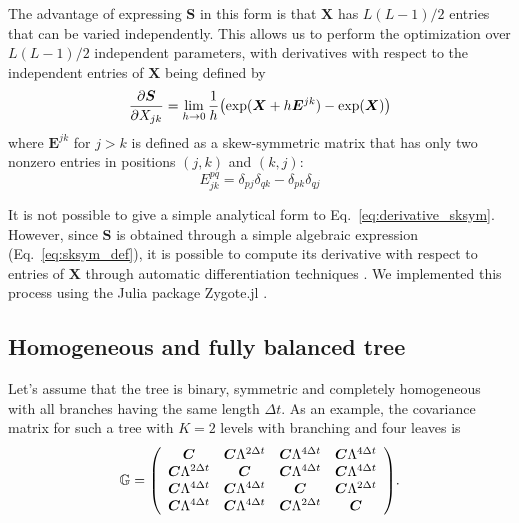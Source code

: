 \documentclass[preprint,amsmath,amssymb,superscriptaddress,showpacs,pre]{revtex4-1}
\let\originalleft\left
\let\originalright\right
\renewcommand{\left}{\mathopen{}\mathclose\bgroup\originalleft}
\renewcommand{\right}{\aftergroup\egroup\originalright}
\begin{document}
The advantage of expressing $\bm S$ in this form is that $\bm X$ has $L(L-1)/2$ entries that can be varied independently. 
This allows us to perform the optimization over $L(L-1)/2$ independent parameters, with derivatives with respect to the independent entries of $\bm X$ being defined by
\begin{equation}
	\frac{\partial \bm S}{\partial X_{jk}}=\lim_{h\rightarrow 0} \frac{1}{h} \left( \exp(\bm X+ h \bm E^{jk}) - \exp(\bm X)\right) 
	\label{eq:derivative_sksym}
\end{equation}
where $\bm E^{jk}$ for $j > k$ is defined as a skew-symmetric matrix that has only two nonzero entries in positions $(j,k)$ and $(k,j)$:
\begin{equation}
    E^{pq}_{jk}=\delta_{pj}\delta_{qk}-\delta_{pk}\delta_{qj}
\end{equation}

It is not possible to give a simple analytical form to Eq.~\eqref{eq:derivative_sksym}. 
However, since $\bm S$ is obtained through a simple algebraic expression (Eq.~\eqref{eq:sksym_def}), it is possible to compute its derivative with respect to entries of $\bm X$ through automatic differentiation techniques \cite{griewank_automatic_1989}. 
We implemented this process using the Julia package Zygote.jl \cite{Zygote.jl-2018}.

 
 \subsection{Homogeneous and fully balanced tree}
 \label{sub:homogeneous_and_fully_balanced_tree}

Let's assume that the tree is binary, symmetric and completely homogeneous with all branches having the same length $\Delta t$. 
As an example, the covariance matrix for such a tree with $K=2$ levels with branching and four leaves is
\begin{equation} 
\mathbb{G} =  \left(
\begin{array}{cccc}
{ \bm C} & {\bm C} \Lambda ^{2\Delta t} & {\bm C} \Lambda ^{4\Delta t} & {\bm C} \Lambda ^{4\Delta t} \\
{\bm C} \Lambda ^{2\Delta t} & {\bm C} & {\bm C} \Lambda ^{4\Delta t} & {\bm C} \Lambda ^{4\Delta t} \\
{\bm C} \Lambda ^{4\Delta t} & {\bm C} \Lambda ^{4\Delta t} & {\bm C} & {\bm C} \Lambda ^{2\Delta t} \\
{\bm C} \Lambda ^{4\Delta t} & {\bm C} \Lambda ^{4\Delta t} & {\bm C} \Lambda ^{2\Delta t} & {\bm C} \\
\end{array}\label{eq:G}
\right).
\end{equation}
\end{document}
